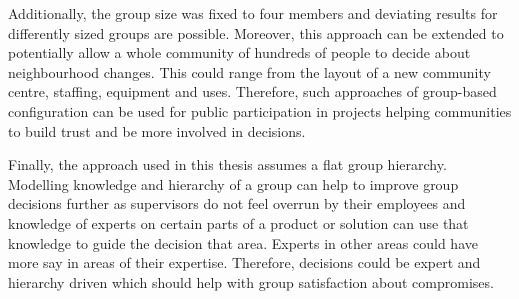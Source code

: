 Additionally, the group size was fixed to four members and deviating results for differently sized groups are possible. Moreover, this approach can be extended to potentially allow a whole community of hundreds of people to decide about neighbourhood changes. This could range from the layout of a new community centre, staffing, equipment and uses. Therefore, such approaches of group-based configuration can be used for public participation in projects helping communities to build trust and be more involved in decisions.

Finally, the approach used in this thesis assumes a flat group hierarchy. Modelling knowledge and hierarchy of a group can help to improve group decisions further as supervisors do not feel overrun by their employees and knowledge of experts on certain parts of a product or solution can use that knowledge to guide the decision that area. Experts in other areas could have more say in areas of their expertise. Therefore, decisions could be expert and hierarchy driven which should help with group satisfaction about compromises.